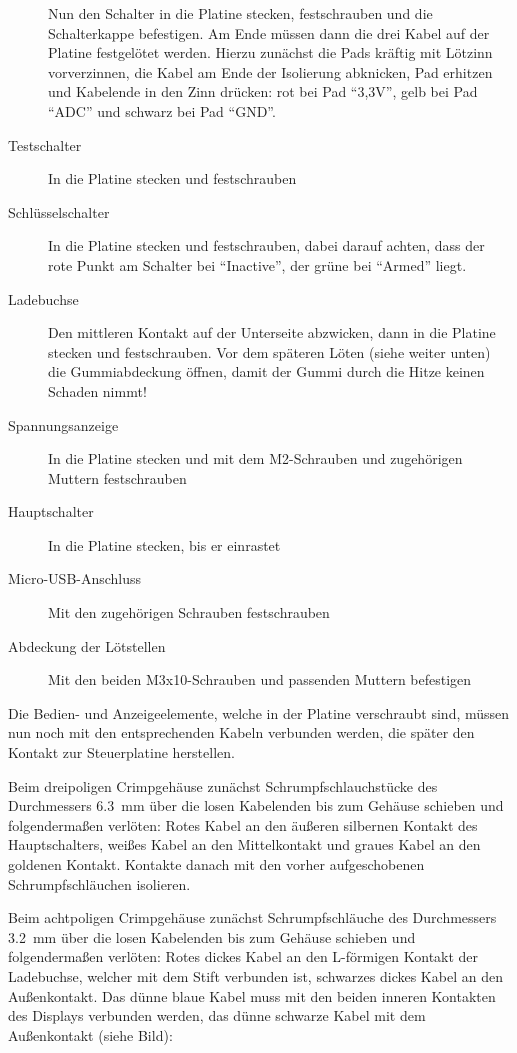 \documentclass[paper=a4, open=any]{scrbook}
\begin{document}
\begin{description}
					      Nun den Schalter in die Platine stecken, festschrauben und die Schalterkappe befestigen. Am Ende müssen dann die drei Kabel auf der Platine festgelötet werden. Hierzu zunächst die Pads kräftig mit Lötzinn vorverzinnen, die Kabel am Ende der Isolierung abknicken, Pad erhitzen und Kabelende in den Zinn drücken: rot bei Pad \enquote{3,3V}, gelb bei Pad \enquote{ADC} und schwarz bei Pad \enquote{GND}.
					\item [Testschalter] In die Platine stecken und festschrauben
					\item [Schlüsselschalter] In die Platine stecken und festschrauben, dabei darauf achten, dass der rote Punkt am Schalter bei \enquote{Inactive}, der grüne bei \enquote{Armed} liegt.
					\item [Ladebuchse] Den mittleren Kontakt auf der Unterseite abzwicken, dann in die Platine stecken und festschrauben. Vor dem späteren Löten (siehe weiter unten) die Gummiabdeckung öffnen, damit der Gummi durch die Hitze keinen Schaden nimmt!
					\item [Spannungsanzeige] In die Platine stecken und mit dem M2-Schrauben und zugehörigen Muttern festschrauben
					\item [Hauptschalter] In die Platine stecken, bis er einrastet
					\item [Micro-USB-Anschluss] Mit den zugehörigen Schrauben festschrauben
					\item [Abdeckung der Lötstellen] Mit den beiden M3x10-Schrauben und passenden Muttern befestigen
				\end{description}

				Die Bedien- und Anzeigeelemente, welche in der Platine verschraubt sind, müssen nun noch mit den entsprechenden Kabeln verbunden werden, die später den Kontakt zur Steuerplatine herstellen.

				Beim dreipoligen Crimpgehäuse zunächst Schrumpfschlauchstücke des Durchmessers \SI{6,3}{\milli\metre} über die losen Kabelenden bis zum Gehäuse schieben und folgendermaßen verlöten: Rotes Kabel an den äußeren silbernen Kontakt des Hauptschalters, weißes Kabel an den Mittelkontakt und graues Kabel an den goldenen Kontakt. Kontakte danach mit den vorher aufgeschobenen Schrumpfschläuchen isolieren.

				Beim achtpoligen Crimpgehäuse zunächst Schrumpfschläuche des Durchmessers \SI{3,2}{\milli\metre} über die losen Kabelenden bis zum Gehäuse schieben und folgendermaßen verlöten: Rotes dickes Kabel an den L-förmigen Kontakt der Ladebuchse, welcher mit dem Stift verbunden ist, schwarzes dickes Kabel an den Außenkontakt. Das dünne blaue Kabel muss mit den beiden inneren Kontakten des Displays verbunden werden, das dünne schwarze Kabel mit dem Außenkontakt (siehe Bild):
\end{document}
